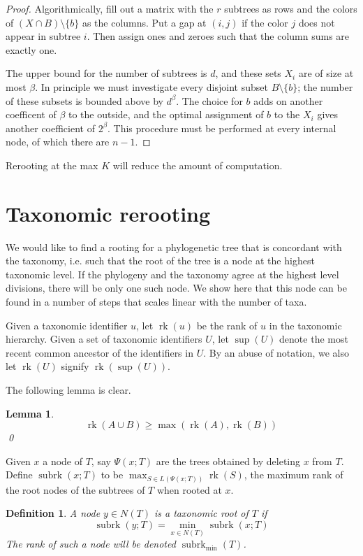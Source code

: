 \documentclass{amsart}
\newcommand{\treecut}{\Psi}
\newcommand{\bad}{\beta}
\newcommand{\rk}{\operatorname{rk}}
\newcommand{\subrk}{\operatorname{subrk}}
\newcommand{\minsubrk}{\subrk_{\min}}
\newcommand{\mrca}{\sup}
\newtheorem{lemma}{Lemma}
\newtheorem{defn}{Definition}
\begin{document}
\begin{proof}
Algorithmically, fill out a matrix with the $r$ subtrees as rows and the colors of $(X \cap B) \setminus \{b\}$ as the columns.
Put a gap at $(i,j)$ if the color $j$ does not appear in subtree $i$.
Then assign ones and zeroes such that the column sums are exactly one.

The upper bound for the number of subtrees is $d$, and these sets $X_i$ are of size at most $\bad$.
In principle we must investigate every disjoint subset $B \setminus \{b\}$; the number of these subsets is bounded above by $d^{\bad}$.
The choice for $b$ adds on another coefficent of $\bad$ to the outside, and the optimal assignment of $b$ to the $X_i$ gives another coefficient of $2^\bad$.
This procedure must be performed at every internal node, of which there are $n-1$.
\end{proof}

Rerooting at the max $K$ will reduce the amount of computation.

\section{Taxonomic rerooting}

We would like to find a rooting for a phylogenetic tree that is concordant with the taxonomy, i.e. such that the root of the tree is a node at the highest taxonomic level.
If the phylogeny and the taxonomy agree at the highest level divisions, there will be only one such node.
We show here that this node can be found in a number of steps that scales linear with the number of taxa.

Given a taxonomic identifier $u$, let $\rk(u)$ be the rank of $u$ in the taxonomic hierarchy.
Given a set of taxonomic identifiers $U$, let $\mrca(U)$ denote the most recent common ancestor of the identifiers in $U$.
By an abuse of notation, we also let $\rk(U)$ signify $\rk(\mrca(U))$.

The following lemma is clear.
\begin{lemma}
  \[
  \rk(A \cup B) \geq \max(\rk(A),\rk(B))
  \]
\qed
\end{lemma}

Given $x$ a node of $T$, say $\treecut(x;T)$ are the trees obtained by deleting $x$ from $T$.
Define $\subrk(x;T)$ to be $\max_{S \in L(\treecut(x;T))} \rk(S)$, the maximum rank of the root nodes of the subtrees of $T$ when rooted at $x$.

\begin{defn}
  A node $y \in N(T)$ is a \emph{taxonomic root} of $T$ if
  \[
    \subrk(y;T) = \min_{x \in N(T)} \subrk(x;T)
  \]
  The rank of such a node will be denoted $\minsubrk(T)$.
\end{defn}
\end{document}
